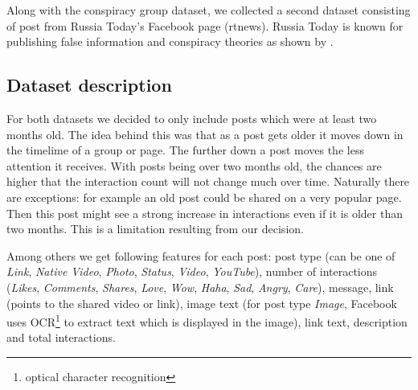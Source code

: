 Along with the conspiracy group dataset, we collected a second dataset consisting of
post from Russia Today's Facebook page (rtnews). Russia Today is known for  publishing
false information and conspiracy theories as shown by \citet{yablokov2015conspiracy}. 

\subsection{Dataset description}
\label{subsec:dataset:description}
For both datasets we decided to only include posts which were at least two months old. The
 idea behind this was that as a post gets older it moves down in the timelime of a group
or  page. The further down a post moves the less attention it receives. With posts being
over two months old, the chances are higher that the interaction count will not change
much over time. Naturally there are exceptions: for example an old post could be shared
on a very popular page. Then this  post might see a strong increase in interactions even
if it is older than two months. This is a limitation resulting from our decision. 

Among others we get following features for each post: post type (can be one of \emph{Link},
\emph{Native Video}, \emph{Photo}, \emph{Status}, \emph{Video}, \emph{YouTube}), number of
interactions (\emph{Likes}, \emph{Comments}, \emph{Shares}, \emph{Love}, \emph{Wow},
\emph{Haha}, \emph{Sad}, \emph{Angry}, \emph{Care}), message, link (points to the shared
video or link), image text (for  post type \emph{Image}, Facebook uses
OCR\footnote{optical character recognition} to extract  text which is displayed in the
image), link text, description and total interactions.

